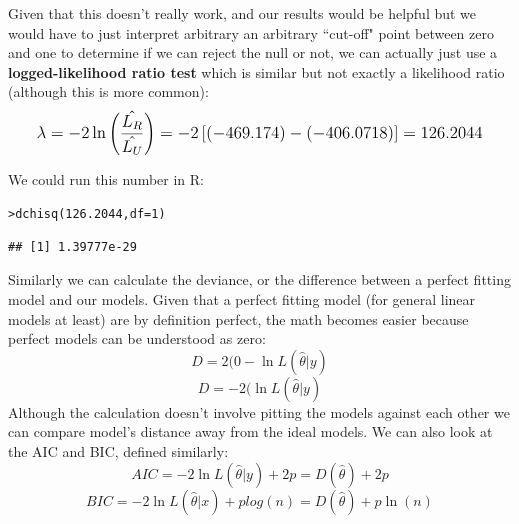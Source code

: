 \documentclass[12pt]{article}\usepackage[]{graphicx}\usepackage[]{color}
\makeatletter
\newcommand{\hlnum}[1]{\textcolor[rgb]{0.82,0.78,0.62}{#1}}%
\newcommand{\hlstd}[1]{\textcolor[rgb]{0.882,0.878,0.898}{#1}}%
\newcommand{\hlkwc}[1]{\textcolor[rgb]{0.812,0.522,0.388}{#1}}%
\newcommand{\hlkwd}[1]{\textcolor[rgb]{0.733,0.388,0.812}{#1}}%
\newenvironment{kframe}{%
 \def\at@end@of@kframe{}%
 \ifinner\ifhmode%
  \def\at@end@of@kframe{\end{minipage}}%
  \begin{minipage}{\columnwidth}%
 \fi\fi%
 \def\FrameCommand##1{\hskip\@totalleftmargin \hskip-\fboxsep
 \colorbox{shadecolor}{##1}\hskip-\fboxsep
     \hskip-\linewidth \hskip-\@totalleftmargin \hskip\columnwidth}%
 \MakeFramed {\advance\hsize-\width
   \@totalleftmargin\z@ \linewidth\hsize
   \@setminipage}}%
 {\par\unskip\endMakeFramed%
 \at@end@of@kframe}
\newenvironment{knitrout}{}{} %
\makeatother
\begin{document}
\begin{flushleft}
Given that this doesn't really work, and our results would be helpful but we would have to just interpret arbitrary an arbitrary ``cut-off" point between zero and one to determine if we can reject the null or not, we can actually just use a \textbf{logged-likelihood ratio test} which is similar but not exactly a likelihood ratio (although this is more common):\\
\begin{equation}
\mathlarger{  \lambda = -2 \ln \left( \frac{ \hat{L_R}}{ \hat{L_U}}  \right) = -2 \left[(-469.174) - (-406.0718) \right] = 126.2044  }
\end{equation}

\clearpage

We could run this number in R: \\

\begin{knitrout}
\color{fgcolor}\begin{kframe}
\begin{alltt}
\hlstd{> }\hlkwd{dchisq}\hlstd{(}\hlnum{126.2044}\hlstd{,} \hlkwc{df}\hlstd{=}\hlnum{1}\hlstd{)}
\end{alltt}
\begin{verbatim}
## [1] 1.39777e-29
\end{verbatim}
\end{kframe}
\end{knitrout}


Similarly we can calculate the deviance, or the difference between a perfect fitting model and our models. Given that a perfect fitting model (for general linear models at least) are by definition perfect, the math becomes easier because perfect models can be understood as zero: \\
\begin{equation}
D = 2(0- \ln L(\hat{\theta} \vert y)
\end{equation}
\begin{equation}
 D = -2( \ln L(\hat{\theta} \vert y)
\end{equation}
Although the calculation doesn't involve pitting the models against each other we can compare model's distance away from the ideal models. We can also look at the AIC and BIC, defined similarly:\\
\begin{equation}
AIC = -2 \ln L(\hat{\theta} \vert y) + 2p = D(\hat{\theta} ) +2p
\end{equation}
\begin{equation}
BIC = -2 \ln L(\hat{\theta} \vert x) +plog(n) = D(\hat{\theta}) + p \ln (n)
\end{equation}



\end{flushleft}
\end{document}
